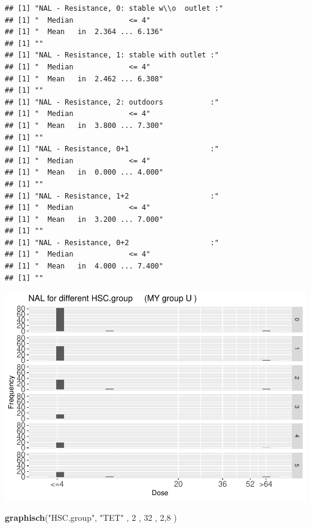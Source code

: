 \documentclass[
]{article}
\newenvironment{Shaded}{\begin{snugshade}}{\end{snugshade}}
\newcommand{\DecValTok}[1]{\textcolor[rgb]{0.00,0.00,0.81}{#1}}
\newcommand{\KeywordTok}[1]{\textcolor[rgb]{0.13,0.29,0.53}{\textbf{#1}}}
\newcommand{\NormalTok}[1]{#1}
\newcommand{\StringTok}[1]{\textcolor[rgb]{0.31,0.60,0.02}{#1}}
\begin{document}
\begin{verbatim}
## [1] "NAL - Resistance, 0: stable w\\o  outlet :"
## [1] "  Median             <= 4"
## [1] "  Mean   in  2.364 ... 6.136"
## [1] ""
## [1] "NAL - Resistance, 1: stable with outlet :"
## [1] "  Median             <= 4"
## [1] "  Mean   in  2.462 ... 6.308"
## [1] ""
## [1] "NAL - Resistance, 2: outdoors           :"
## [1] "  Median             <= 4"
## [1] "  Mean   in  3.800 ... 7.300"
## [1] ""
## [1] "NAL - Resistance, 0+1                   :"
## [1] "  Median             <= 4"
## [1] "  Mean   in  0.000 ... 4.000"
## [1] ""
## [1] "NAL - Resistance, 1+2                   :"
## [1] "  Median             <= 4"
## [1] "  Mean   in  3.200 ... 7.000"
## [1] ""
## [1] "NAL - Resistance, 0+2                   :"
## [1] "  Median             <= 4"
## [1] "  Mean   in  4.000 ... 7.400"
## [1] ""
\end{verbatim}

\includegraphics{Verteilungen_files/figure-latex/unnamed-chunk-53-1.pdf}

\begin{Shaded}
\begin{Highlighting}[]
   \KeywordTok{graphisch}\NormalTok{(}\StringTok{"HSC.group"}\NormalTok{, }\StringTok{"TET"}\NormalTok{ , }\DecValTok{2}\NormalTok{    ,  }\DecValTok{32}\NormalTok{   ,   }\DecValTok{2}\NormalTok{,}\DecValTok{8}\NormalTok{    ) }
\end{Highlighting}
\end{Shaded}
\end{document}
